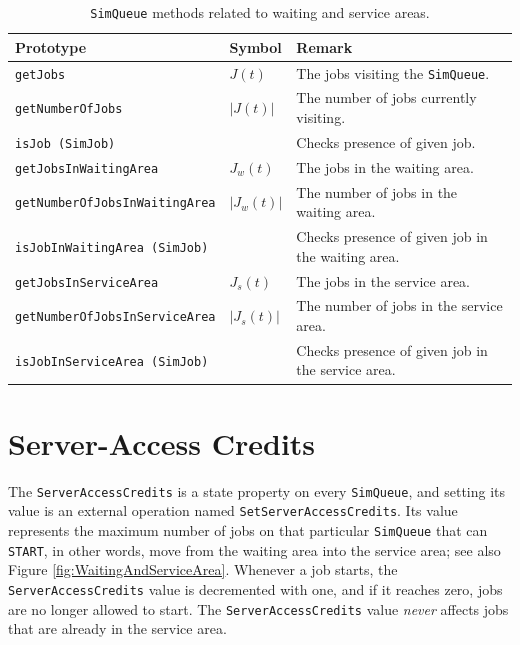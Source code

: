 \documentclass[12pt]{book}
\begin{document}
\begin{table}[h]
\caption{\lstinline|SimQueue| methods related to waiting and service areas.}
\label{simqueue-methods-areas}
\begin{tabular}{|l|l|l|}
\hline
Prototype & Symbol & Remark \\ \hline
\lstinline|getJobs|                      & $J(t)$      & The jobs visiting the \lstinline|SimQueue|.       \\ \hline
\lstinline|getNumberOfJobs|              & $|J(t)|$    & The number of jobs currently visiting.            \\ \hline
\lstinline|isJob (SimJob)|               &             & Checks presence of given job.                     \\ \hline
\lstinline|getJobsInWaitingArea|         & $J_w(t)$    & The jobs in the waiting area.                     \\ \hline
\lstinline|getNumberOfJobsInWaitingArea| & $|J_w(t)|$  & The number of jobs in the waiting area.           \\ \hline
\lstinline|isJobInWaitingArea (SimJob)|  &             & Checks presence of given job in the waiting area. \\ \hline
\lstinline|getJobsInServiceArea|         & $J_s(t)$    & The jobs in the service area.                     \\ \hline
\lstinline|getNumberOfJobsInServiceArea| & $|J_s(t)|$  & The number of jobs in the service area.           \\ \hline
\lstinline|isJobInServiceArea (SimJob)|  &             & Checks presence of given job in the service area. \\ \hline
\end{tabular}
\end{table}

\section{Server-Access Credits}
\label{sec:guided:sac}

The \lstinline|ServerAccessCredits|
  is a state property on every \lstinline|SimQueue|,
  and setting its value is an
  external operation
  named \lstinline|SetServerAccessCredits|.
Its value represents the maximum number of
  jobs on that particular \lstinline|SimQueue|
  that can \lstinline|START|,
  in other words,
  move from the waiting area into
  the service area;
  see also Figure \ref{fig:WaitingAndServiceArea}.
Whenever a job starts,
  the \lstinline|ServerAccessCredits| value
  is decremented with one,
  and if it reaches zero,
  jobs are no longer allowed to start.
The \lstinline|ServerAccessCredits| value
  {\em never\/}
  affects jobs that are already in the
  service area.
\end{document}
